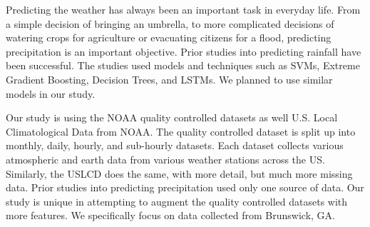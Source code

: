 \documentclass[../report.tex]{subfiles}
\begin{document}
Predicting the weather has always been an important task in everyday life.
From a simple decision of bringing an umbrella, to more complicated decisions of watering crops for agriculture or evacuating citizens for a flood, predicting precipitation is an important objective.
Prior studies into predicting rainfall have been successful.
The studies used models and techniques such as SVMs, Extreme Gradient Boosting, Decision Trees, and LSTMs. \cite*{liyew_machine_2021,barrera-animas_rainfall_2022,rahman_rainfall_2022}
We planned to use similar models in our study.

Our study is using the NOAA quality controlled datasets \cite*{diamond_us_2013} as well U.S. Local Climatological Data from NOAA\cite*{NOAA_local_1996}.
The quality controlled dataset is split up into monthly, daily, hourly, and sub-hourly datasets.
Each dataset collects various atmospheric and earth data from various weather stations across the US.
Similarly, the USLCD does the same, with more detail, but much more missing data.
Prior studies into predicting precipitation used only one source of data.
Our study is unique in attempting to augment the quality controlled datasets with more features.
We specifically focus on data collected from Brunswick, GA.
\end{document}
